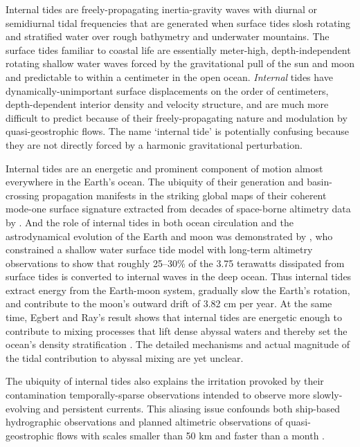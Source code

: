\documentclass[12pt, oneside]{book}
\begin{document}
Internal tides are freely-propagating inertia-gravity waves with diurnal or semidiurnal tidal frequencies that are generated when surface tides slosh rotating and stratified water over rough bathymetry and underwater mountains.  The surface tides familiar to coastal life are essentially meter-high, depth-independent rotating shallow water waves forced by the gravitational pull of the sun and moon and predictable to within a centimeter in the open ocean.  \textit{Internal} tides have dynamically-unimportant surface displacements on the order of centimeters, depth-dependent interior density and velocity structure, and are much more difficult to predict because of their freely-propagating nature and modulation by quasi-geostrophic flows.  The name `internal tide' is potentially confusing because they are not directly forced by a harmonic gravitational perturbation.

Internal tides are an energetic and prominent component of motion almost everywhere in the Earth's ocean.  The ubiquity of their generation and basin-crossing propagation manifests in the striking global maps of their coherent mode-one surface signature extracted from decades of space-borne altimetry data by \citet{zhao2016global}.  And the role of internal tides in both ocean circulation and the astrodynamical evolution of the Earth and moon was demonstrated by \citet{egbert2000significant}, who constrained a shallow water surface tide model with long-term altimetry observations to show that roughly 25--30\% of the 3.75 terawatts dissipated from surface tides is converted to internal waves in the deep ocean.  Thus internal tides extract energy from the Earth-moon system, gradually slow the Earth's rotation, and contribute to the moon's outward drift of 3.82 cm per year.  At the same time, Egbert and Ray's result shows that internal tides are energetic enough to contribute to mixing processes that lift dense abyssal waters and thereby set the ocean's density stratification \citep{Ferrari2009}.  The detailed mechanisms and actual magnitude of the tidal contribution to abyssal mixing are yet unclear.

The ubiquity of internal tides also explains the irritation provoked by their contamination temporally-sparse observations intended to observe more slowly-evolving and persistent currents.  This aliasing issue confounds both ship-based hydrographic observations \citep{wunsch1975internal, munk1981internal} and planned altimetric observations of quasi-geostrophic flows with scales smaller than 50 km and faster than a month \citep{ponte2015incoherent}.
\end{document}
